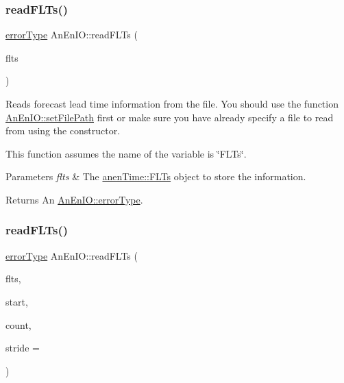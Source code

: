 \subsubsection{\texorpdfstring{read\+F\+L\+Ts()}{readFLTs()}\hspace{0.1cm}{\footnotesize\ttfamily [1/2]}}
{\footnotesize\ttfamily \mbox{\hyperlink{class_an_en_i_o_aa56bc1ec6610b86db4349bce20f9ead0}{error\+Type}} An\+En\+I\+O\+::read\+F\+L\+Ts (\begin{DoxyParamCaption}\item[{\mbox{\hyperlink{classanen_time_1_1_f_l_ts}{anen\+Time\+::\+F\+L\+Ts}} \&}]{flts }\end{DoxyParamCaption})}

Reads forecast lead time information from the file. You should use the function \mbox{\hyperlink{class_an_en_i_o_a98066d375cc78694fda2af1ce37cc8d8}{An\+En\+I\+O\+::set\+File\+Path}} first or make sure you have already specify a file to read from using the constructor.

This function assumes the name of the variable is \char`\"{}\+F\+L\+Ts\char`\"{}.


\begin{DoxyParams}{Parameters}
{\em flts} & The \mbox{\hyperlink{classanen_time_1_1_f_l_ts}{anen\+Time\+::\+F\+L\+Ts}} object to store the information. \\
\hline
\end{DoxyParams}
\begin{DoxyReturn}{Returns}
An \mbox{\hyperlink{class_an_en_i_o_aa56bc1ec6610b86db4349bce20f9ead0}{An\+En\+I\+O\+::error\+Type}}. 
\end{DoxyReturn}
\mbox{\label{class_an_en_i_o_a521772f8c969c2fa4ca8ebf1ffa0a460}} 
\subsubsection{\texorpdfstring{read\+F\+L\+Ts()}{readFLTs()}\hspace{0.1cm}{\footnotesize\ttfamily [2/2]}}
{\footnotesize\ttfamily \mbox{\hyperlink{class_an_en_i_o_aa56bc1ec6610b86db4349bce20f9ead0}{error\+Type}} An\+En\+I\+O\+::read\+F\+L\+Ts (\begin{DoxyParamCaption}\item[{\mbox{\hyperlink{classanen_time_1_1_f_l_ts}{anen\+Time\+::\+F\+L\+Ts}} \&}]{flts,  }\item[{size\+\_\+t}]{start,  }\item[{size\+\_\+t}]{count,  }\item[{ptrdiff\+\_\+t}]{stride = {} }\end{DoxyParamCaption})}

